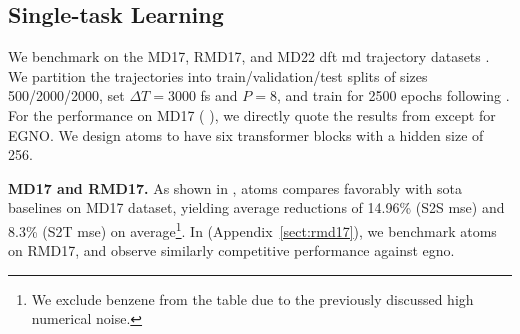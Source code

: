 \subsection{Single-task Learning}
\label{sec:singletask_learning}
We benchmark on the MD17, RMD17, {and MD22} \gls{dft} \gls{md} trajectory datasets \cite{chmiela_machine_2017, christensen_role_2020, chmiela_accurate_2023}. We partition the trajectories into train/validation/test splits of sizes 500/2000/2000, set \(\Delta T = 3000\) fs and \(P = 8\), and train for 2500 epochs following \cite{xu_equivariant_2024}. For the performance on MD17 ( ), we directly quote the results from \cite{xu_equivariant_2024} except for EGNO. 
We design \gls{atoms} to have six transformer blocks with a hidden size of 256.

\textbf{MD17 and RMD17.} 
As shown in , \gls{atoms} compares favorably with \gls{sota} baselines on MD17 dataset, 
yielding average reductions of 14.96\% (S2S \gls{mse}) and 8.3\% (S2T \gls{mse}) on average\footnote{We exclude benzene from the table due to the previously discussed high numerical noise.}. In  (Appendix~\ref{sect:rmd17}), we benchmark \gls{atoms} on RMD17, and observe similarly competitive performance against \gls{egno}.


